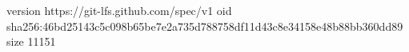 version https://git-lfs.github.com/spec/v1
oid sha256:46bd25143c5c098b65be7e2a735d788758df11d43c8e34158e48b88bb360dd89
size 11151
